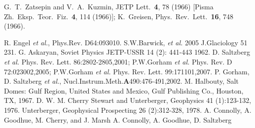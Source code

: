 \documentclass{elsart}
\begin{document}
\begin{thebibliography}{00}
  
    
    
    
  G.~T.~Zatsepin and V.~A.~Kuzmin,
  JETP Lett.\  {\bf 4}, 78 (1966)
  [Pisma Zh.\ Eksp.\ Teor.\ Fiz.\  {\bf 4}, 114 (1966)];
  K.~Greisen,
  Phys.\ Rev.\ Lett.\  {\bf 16}, 748 (1966).

 R. Engel {\it et al.}, Phys.Rev. D64:093010.
S.W.Barwick, {\em et al.} 2005 J.Glaciology 51 231.
G. Askaryan, Soviet Physics JETP-USSR 14 (2): 441-443 1962.
D. Saltzberg {\em et al.} Phys. Rev. Lett. 86:2802-2805,2001; 
  P.W.Gorham {\em et al.} Phys. Rev. D 72:023002,2005; 
  P.W.Gorham {\em et al.} Phys. Rev. Lett. 99:171101,2007.
P. Gorham, D. Saltzberg {\em et al.}, Nucl.Instrum.Meth.{\bf A}490:476-491,2002.
M. Halbouty, Salt Domes: Gulf Region, United States and Mexico, Gulf Publishing Co., Houston, TX, 1967.
 D. W.
M. Cherry
Stewart and Unterberger, Geophysics 41 (1):123-132, 1976.
Unterberger, Geophysical Prospecting 26 (2):312-328, 1978.
A. Connolly, A. Goodhue, M. Cherry, and J. Marsh
A. Connolly, A. Goodhue, D. Saltzberg
  
\end{thebibliography}
\end{document}

